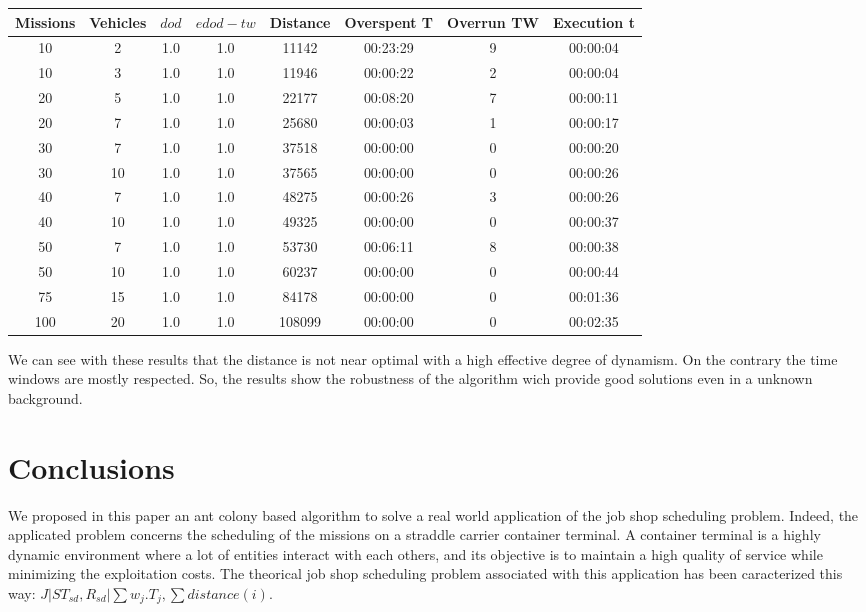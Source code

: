 \documentclass[a4paper,10pt]{article}
\begin{document}
  \small
  \begin{center}
    \begin{tabular}{|c|c|c|c|c|c|c|c|} 
    \hline
    \bf{Missions} & \bf{Vehicles} & \bf{$dod$} & \bf{$edod-tw$} & \bf{Distance} & \bf{Overspent T} & \bf{Overrun TW} &  \bf{Execution t} \\ \hline
    10	 & 2 	& 1.0	& 1.0	& 11142	& 00:23:29	& 9	& 00:00:04\\
    10	 & 3 	& 1.0	& 1.0	& 11946	& 00:00:22	& 2	& 00:00:04\\
    20	 & 5 	& 1.0	& 1.0	& 22177	& 00:08:20	& 7	& 00:00:11\\
    20	 & 7 	& 1.0	& 1.0	& 25680	& 00:00:03	& 1	& 00:00:17\\
    30	 & 7 	& 1.0	& 1.0	& 37518	& 00:00:00	& 0	& 00:00:20\\
    30	 & 10 	& 1.0	& 1.0	& 37565	& 00:00:00	& 0	& 00:00:26\\
    40	 & 7 	& 1.0	& 1.0	& 48275	& 00:00:26	& 3	& 00:00:26\\
    40	 & 10 	& 1.0	& 1.0	& 49325	& 00:00:00	& 0	& 00:00:37\\
    50	 & 7 	& 1.0	& 1.0	& 53730	& 00:06:11	& 8	& 00:00:38\\
    50	 & 10 	& 1.0	& 1.0	& 60237	& 00:00:00	& 0	& 00:00:44\\
    75	 & 15 	& 1.0	& 1.0	& 84178	& 00:00:00	& 0	& 00:01:36\\
    100	 & 20 	& 1.0	& 1.0	& 108099& 00:00:00	& 0	& 00:02:35\\
    \hline
    \end{tabular}
  \end{center}
  \normalsize

We can see with these results that the distance is not near optimal with a high effective degree of dynamism. On the contrary the time windows are mostly respected. So, the results show the robustness of the algorithm wich provide good solutions even in a unknown background.



\section{Conclusions}

We proposed in this paper an ant colony based algorithm to solve a real world application of the job shop scheduling problem. Indeed, the applicated problem concerns the scheduling of the missions on a straddle carrier container terminal. A container terminal is a highly dynamic environment where a lot of entities interact with each others, and its objective is to maintain a high quality of service while minimizing the exploitation costs. The theorical job shop scheduling problem associated with this application has been caracterized this way: ${ J|ST_{sd}, R_{sd}|\sum w_j.T_{j} , \sum distance(i)}$.\\
\end{document}
